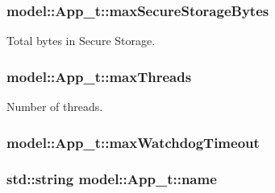 \subsubsection[{\texorpdfstring{max\+Secure\+Storage\+Bytes}{maxSecureStorageBytes}}]{ model\+::\+App\+\_\+t\+::max\+Secure\+Storage\+Bytes}\hypertarget{structmodel_1_1_app__t_ad6a52e97dd3d0bf9b5704b1132887250}{}\label{structmodel_1_1_app__t_ad6a52e97dd3d0bf9b5704b1132887250}


Total bytes in Secure Storage. 

\subsubsection[{\texorpdfstring{max\+Threads}{maxThreads}}]{ model\+::\+App\+\_\+t\+::max\+Threads}\hypertarget{structmodel_1_1_app__t_aff53e95558038d4da482b6ac38a1a2f8}{}\label{structmodel_1_1_app__t_aff53e95558038d4da482b6ac38a1a2f8}


Number of threads. 

\subsubsection[{\texorpdfstring{max\+Watchdog\+Timeout}{maxWatchdogTimeout}}]{ model\+::\+App\+\_\+t\+::max\+Watchdog\+Timeout}\hypertarget{structmodel_1_1_app__t_a44607babc90ee42d69af83bfc57ad8e0}{}\label{structmodel_1_1_app__t_a44607babc90ee42d69af83bfc57ad8e0}
\subsubsection[{\texorpdfstring{name}{name}}]{\setlength{\rightskip}{0pt plus 5cm}std\+::string model\+::\+App\+\_\+t\+::name}\hypertarget{structmodel_1_1_app__t_ab843dea0c06dde36254c5948322d75e9}{}\label{structmodel_1_1_app__t_ab843dea0c06dde36254c5948322d75e9}


